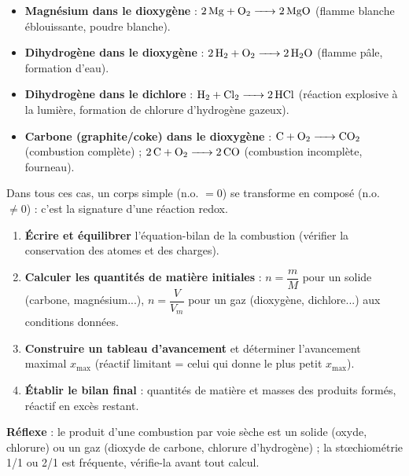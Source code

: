 \documentclass[11pt]{article}
\begin{document}
\begin{exemplebox}
\begin{itemize}
\item \textbf{Magnésium dans le dioxygène} : $\ce{2Mg + O2 -> 2MgO}$ (flamme blanche éblouissante, poudre blanche).
\item \textbf{Dihydrogène dans le dioxygène} : $\ce{2H2 + O2 -> 2H2O}$ (flamme pâle, formation d'eau).
\item \textbf{Dihydrogène dans le dichlore} : $\ce{H2 + Cl2 -> 2HCl}$ (réaction explosive à la lumière, formation de chlorure d'hydrogène gazeux).
\item \textbf{Carbone (graphite/coke) dans le dioxygène} : $\ce{C + O2 -> CO2}$ (combustion complète) ; $\ce{2C + O2 -> 2CO}$ (combustion incomplète, fourneau).
\end{itemize}
Dans tous ces cas, un corps simple (n.o. $=0$) se transforme en composé (n.o. $\neq 0$) : c'est la signature d'une réaction redox.
\end{exemplebox}

\begin{methode}
\begin{enumerate}
\item \textbf{Écrire et équilibrer} l'équation-bilan de la combustion (vérifier la conservation des atomes et des charges).
\item \textbf{Calculer les quantités de matière initiales} :
      $n = \dfrac{m}{M}$ pour un solide (carbone, magnésium...),
      $n = \dfrac{V}{V_m}$ pour un gaz (dioxygène, dichlore...) aux conditions données.
\item \textbf{Construire un tableau d'avancement} et déterminer l'avancement maximal $x_{\max}$ (réactif limitant = celui qui donne le plus petit $x_{\max}$).
\item \textbf{Établir le bilan final} : quantités de matière et masses des produits formés, réactif en excès restant.
\end{enumerate}
\textbf{Réflexe} : le produit d'une combustion par voie sèche est un solide (oxyde, chlorure) ou un gaz (dioxyde de carbone, chlorure d'hydrogène) ; la stœchiométrie 1/1 ou 2/1 est fréquente, vérifie-la avant tout calcul.
\end{methode}
\end{document}
